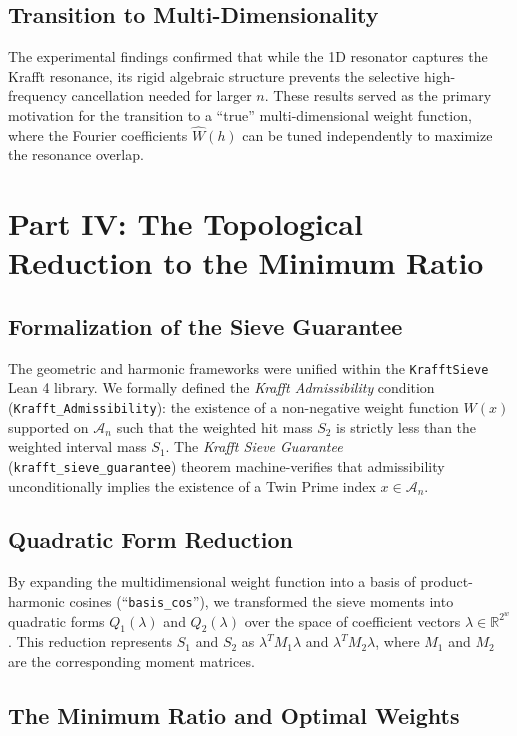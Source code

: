 \documentclass[12pt]{article}
\begin{document}
\subsection{Transition to Multi-Dimensionality}

The experimental findings confirmed that while the 1D resonator captures the Krafft resonance,
its rigid algebraic structure prevents the selective high-frequency cancellation needed for larger $n$.
These results served as the primary motivation for the transition to a ``true'' multi-dimensional
weight function, where the Fourier coefficients $\hat{W}(h)$ can be tuned independently to maximize
the resonance overlap.

\section{Part IV: The Topological Reduction to the Minimum Ratio}

\subsection{Formalization of the Sieve Guarantee}

The geometric and harmonic frameworks were unified within the \texttt{KrafftSieve} Lean 4 library.
We formally defined the \textit{Krafft Admissibility} condition (\texttt{Krafft\_Admissibility}):
the existence of a non-negative weight function $W(x)$ supported on $\mathcal{A}_n$ such that the
weighted hit mass $S_2$ is strictly less than the weighted interval mass $S_1$. The
\textit{Krafft Sieve Guarantee} (\texttt{krafft\_sieve\_guarantee}) theorem machine-verifies that
admissibility unconditionally implies the existence of a Twin Prime index $x \in \mathcal{A}_n$.

\subsection{Quadratic Form Reduction}

By expanding the multidimensional weight function into a basis of product-harmonic cosines
(``\texttt{basis\_cos}''), we transformed the sieve moments into quadratic forms $Q_1(\lambda)$ and
$Q_2(\lambda)$ over the space of coefficient vectors $\lambda \in \mathbb{R}^{2^w}$. This reduction
represents $S_1$ and $S_2$ as $\lambda^T M_1 \lambda$ and $\lambda^T M_2 \lambda$, where $M_1$ and
$M_2$ are the corresponding moment matrices.

\subsection{The Minimum Ratio and Optimal Weights}
\end{document}

